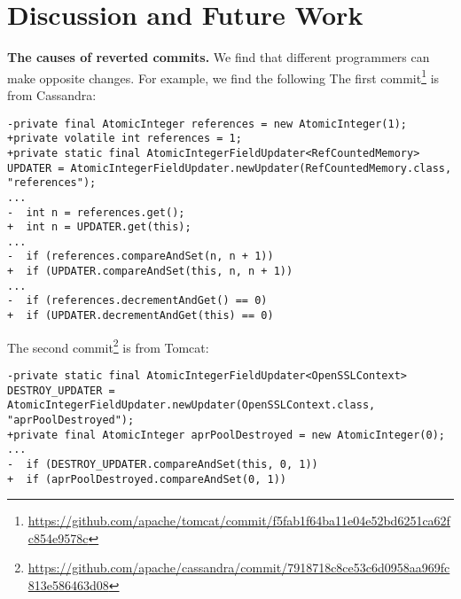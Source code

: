 \section{Discussion and Future Work}
\label{sec:discuss}
%
%
%
%
%
%
%
%

\noindent
\textbf{The causes of reverted commits.} We find that different programmers can make opposite changes. For example, we find the following The first commit\footnote{\url{https://github.com/apache/tomcat/commit/f5fab1f64ba11e04e52bd6251ca62fc854e9578c}} is from Cassandra:

\begin{lstlisting}
-private final AtomicInteger references = new AtomicInteger(1);
+private volatile int references = 1;
+private static final AtomicIntegerFieldUpdater<RefCountedMemory> UPDATER = AtomicIntegerFieldUpdater.newUpdater(RefCountedMemory.class, "references");
...
-  int n = references.get();
+  int n = UPDATER.get(this);
...
-  if (references.compareAndSet(n, n + 1))
+  if (UPDATER.compareAndSet(this, n, n + 1))
...
-  if (references.decrementAndGet() == 0)
+  if (UPDATER.decrementAndGet(this) == 0)
\end{lstlisting}

The second commit\footnote{\url{https://github.com/apache/cassandra/commit/7918718c8ce53c6d0958aa969fc813e586463d08}} is from Tomcat:

\begin{lstlisting}
-private static final AtomicIntegerFieldUpdater<OpenSSLContext> DESTROY_UPDATER = AtomicIntegerFieldUpdater.newUpdater(OpenSSLContext.class, "aprPoolDestroyed");
+private final AtomicInteger aprPoolDestroyed = new AtomicInteger(0);
...
-  if (DESTROY_UPDATER.compareAndSet(this, 0, 1))
+  if (aprPoolDestroyed.compareAndSet(0, 1))
\end{lstlisting}

